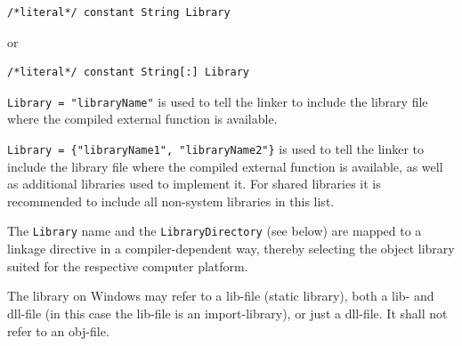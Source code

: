 \begin{annotationdefinition}[Library]
\begin{synopsis}
\begin{lstlisting}
/*literal*/ constant String Library
\end{lstlisting}
or
\begin{lstlisting}
/*literal*/ constant String[:] Library
\end{lstlisting}
\end{synopsis}
\begin{semantics}
{\lstinline!Library = "libraryName"!} is used to tell the linker to include the library file where the compiled external function is available.

{\lstinline!Library = {"libraryName1", "libraryName2"}!} is used to tell the linker to include the library file where the compiled external function is available, as well as additional libraries used to implement it.
For shared libraries it is recommended to include all non-system libraries in this list.

The {\lstinline!Library!} name and the {\lstinline!LibraryDirectory!} (see below) are mapped to a linkage directive in a compiler-dependent way, thereby selecting the object library suited for the respective computer platform.

The library on Windows may refer to a lib-file (static library), both a lib- and dll-file (in this case the lib-file is an import-library), or just a dll-file.
It shall not refer to an obj-file.
\end{semantics}
\end{annotationdefinition}

